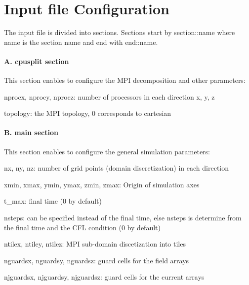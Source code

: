 \section*{Input file Configuration }

The input file is divided into sections. Sections start by {\ttfamily section\+::name} where {\ttfamily name} is the section name and end with {\ttfamily end\+::name}.

\paragraph*{A. cpusplit section}

This section enables to configure the M\+PI decomposition and other parameters\+:


\begin{DoxyItemize}
\item {\ttfamily nprocx}, {\ttfamily nprocy}, {\ttfamily nprocz}\+: number of processors in each direction x, y, z
\item {\ttfamily topology}\+: the M\+PI topology, 0 corresponds to cartesian
\end{DoxyItemize}

\paragraph*{B. main section}

This section enables to configure the general simulation parameters\+:


\begin{DoxyItemize}
\item {\ttfamily nx}, {\ttfamily ny}, {\ttfamily nz}\+: number of grid points (domain discretization) in each direction
\item {\ttfamily xmin}, {\ttfamily xmax}, {\ttfamily ymin}, {\ttfamily ymax}, {\ttfamily zmin}, {\ttfamily zmax}\+: Origin of simulation axes
\item {\ttfamily t\+\_\+max}\+: final time (0 by default)
\item {\ttfamily nsteps}\+: can be specified instead of the final time, else nsteps is determine from the final time and the C\+FL condition (0 by default)
\item {\ttfamily ntilex}, {\ttfamily ntiley}, {\ttfamily ntilez}\+: M\+PI sub-\/domain discetization into tiles
\item {\ttfamily nguardsx}, {\ttfamily nguardsy}, {\ttfamily nguardsz}\+: guard cells for the field arrays
\item {\ttfamily njguardsx}, {\ttfamily njguardsy}, {\ttfamily njguardsz}\+: guard cells for the current arrays
\end{DoxyItemize}


